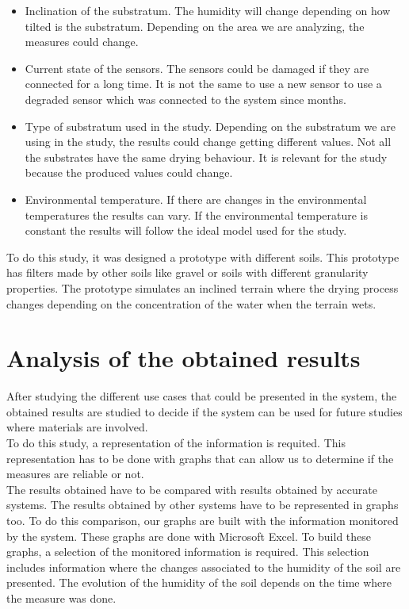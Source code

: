 \begin{itemize}

\item Inclination of the substratum. The humidity will change depending on how tilted is the substratum. Depending on the area we are analyzing, the measures could change.

\item Current state of the sensors. The sensors could be damaged if they are connected for a long time. It is not the same to use a new sensor to use a degraded sensor which was connected to the system since months.

\item Type of substratum used in the study. Depending on the substratum we are using in the study, the results could change getting different values. Not all the substrates have the same drying behaviour. It is relevant for the study because the produced values could change.

\item Environmental temperature. If there are changes in the environmental temperatures the results can vary. If the environmental temperature is constant the results will follow the ideal model used for the study.

\end{itemize}

To do this study, it was designed a prototype with different soils. This prototype has filters made by other soils like gravel or soils with different granularity properties. The prototype simulates an inclined terrain where the drying process changes depending on the concentration of the water when the terrain wets.

\newpage

\section{Analysis of the obtained results}

After studying the different use cases that could be presented in the system, the obtained results are studied to decide if the system can be used for future studies where materials are involved.\\

To do this study, a representation of the information is requited. This representation has to be done with graphs that can allow us to determine if the measures are reliable or not.\\

The results obtained have to be compared with results obtained by accurate systems. The results obtained by other systems have to be represented in graphs too. To do this comparison, our graphs are built with the information monitored by the system. These graphs are done with Microsoft Excel. To build these graphs, a selection of the monitored information is required. This selection includes information where the changes associated to the humidity of the soil are presented. The evolution of the humidity of the soil depends on the time where the measure was done.\\

